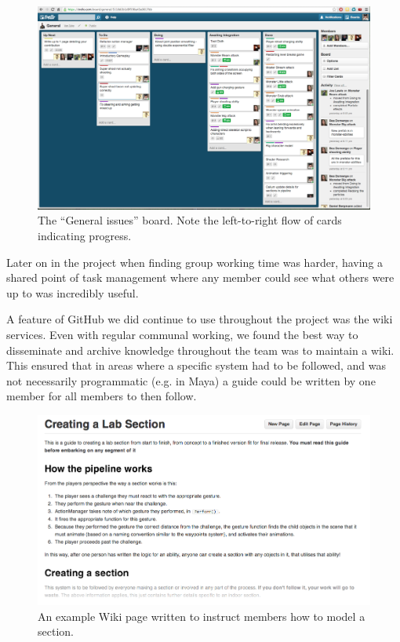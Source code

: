 \documentclass[a4paper,oneside]{memoir}
\begin{document}
		\begin{figure}[ht]
			\begin{center}
				\includegraphics[width=150mm]{../Screenshots/trello-general.png}
				\caption{The ``General issues'' board. Note the left-to-right flow of cards indicating progress.}
				\label{fig:Trello}
			\end{center}
		\end{figure}

		Later on in the project when finding group working time was harder, having a shared point of task management where any member could see what others were up to was incredibly useful.

		A feature of GitHub we did continue to use throughout the project was the wiki services. 
		Even with regular communal working, we found the best way to disseminate and archive knowledge throughout the team was to maintain a wiki. 
		This ensured that in areas where a specific system had to be followed, and was not necessarily programmatic (e.g. in Maya) a guide could be written by one member for all members to then follow.

		\begin{figure}[ht]
			\begin{center}
				\includegraphics[width=150mm]{../Screenshots/github-wiki-page.png}
				\caption{An example Wiki page written to instruct members how to model a section.}
				\label{fig:Github Wiki Page}
			\end{center}
		\end{figure}
\end{document}
